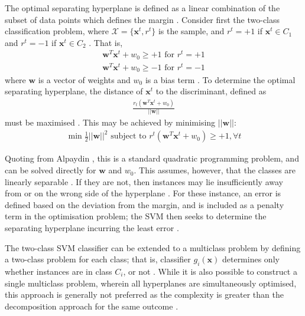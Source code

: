 The optimal separating hyperplane is defined as a linear combination of the subset of data points which defines the margin \cite{alpaydin_2020}. Consider first the two-class classification problem, where $\mathcal{X} = \{\bm{x}^t, r^t\}$ is the sample, and $r^t=+1$ if $\bm{x}^t\in C_1$ and $r^t=-1$ if $\bm{x}^t\in C_2$ \cite{alpaydin_2020}. That is,
\begin{align}
  \bm{w}^T\bm{x}^t + w_0 \geq +1 \text{ for } r^t = +1 \\
  \bm{w}^T\bm{x}^t + w_0 \geq -1 \text{ for } r^t = -1
\end{align}
where $\bm{w}$ is a vector of weights and $w_0$ is a bias term \cite{alpaydin_2020}. To determine the optimal separating hyperplane, the distance of $\bm{x}^t$ to the discriminant, defined as
\begin{align}
  \frac{r_t(\bm{w}^T \bm{x}^t + w_0)}{||\bm{w}||}
\end{align}
must be maximised \cite{alpaydin_2020}. This may be achieved by minimising $||\bm{w}||$:
\begin{align}
  \min \frac{1}{2} ||\bm{w}||^2 \text{ subject to } r^t(\bm{w}^T\bm{x}^t + w_0) \geq +1, \forall t
\end{align}

Quoting from Alpaydin \cite{alpaydin_2020}, this is a standard quadratic programming problem, and can be solved directly for $\bm{w}$ and $w_0$. This assumes, however, that the classes are linearly separable \cite{alpaydin_2020}. If they are not, then instances may lie insufficiently away from or on the wrong side of the hyperplane \cite{alpaydin_2020}. For these instance, an error is defined based on the deviation from the margin, and is included as a penalty term in the optimisation problem; the SVM then seeks to determine the separating hyperplane incurring the least error \cite{alpaydin_2020}.

The two-class SVM classifier can be extended to a multiclass problem by defining a two-class problem for each class; that is, classifier $g_i(\bm{x})$ determines only whether instances are in class $C_i$, or not \cite{alpaydin_2020}. While it is also possible to construct a single multiclass problem, wherein all hyperplanes are simultaneously optimised, this approach is generally not preferred as the complexity is greater than the decomposition approach for the same outcome \cite{alpaydin_2020}.

